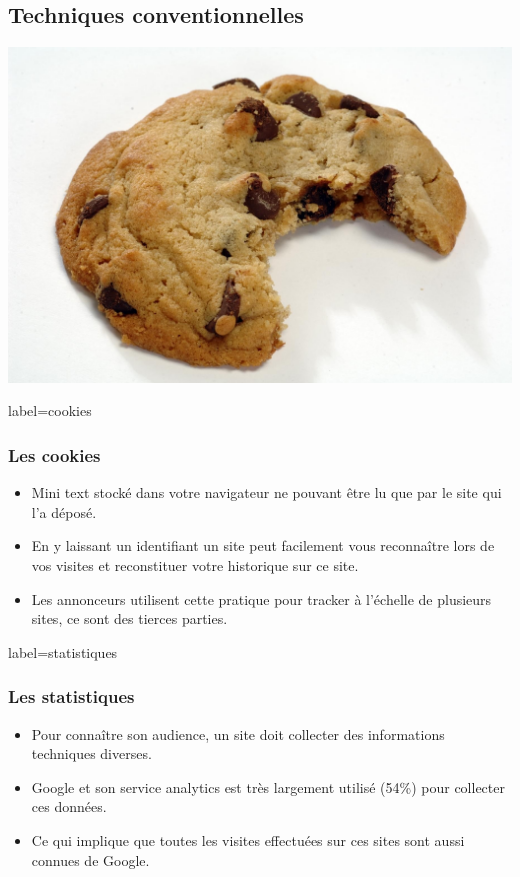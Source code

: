 \documentclass{beamer}
\begin{document}
    \subsection{Techniques conventionnelles}
        \begin{frame}
            \begin{center}
                \includegraphics[scale=0.15]{img/cookie.jpg}
            \end{center}
        \end{frame}
        \begin{frame}{label=cookies}
            \frametitle{Les cookies}
            \begin{center}
                \begin{itemize}
                    \item Mini text stocké dans votre navigateur ne pouvant être lu que par le site qui l'a déposé.
                    \item En y laissant un identifiant un site peut facilement vous reconnaître lors de vos visites et reconstituer votre historique sur ce site.
                    \item Les annonceurs utilisent cette pratique pour tracker à l'échelle de plusieurs sites, ce sont des tierces parties.
                \end{itemize}
            \end{center}
        \end{frame}
        \begin{frame}{label=statistiques}
            \frametitle{Les statistiques}
            \begin{center}
                \begin{itemize}
                    \item Pour connaître son audience, un site doit collecter des informations techniques diverses.
                    \item Google et son service analytics est très largement utilisé (54\%) pour collecter ces données.
                    \item Ce qui implique que toutes les visites effectuées sur ces sites sont aussi connues de Google.
                \end{itemize}
            \end{center}
        \end{frame}
\end{document}

